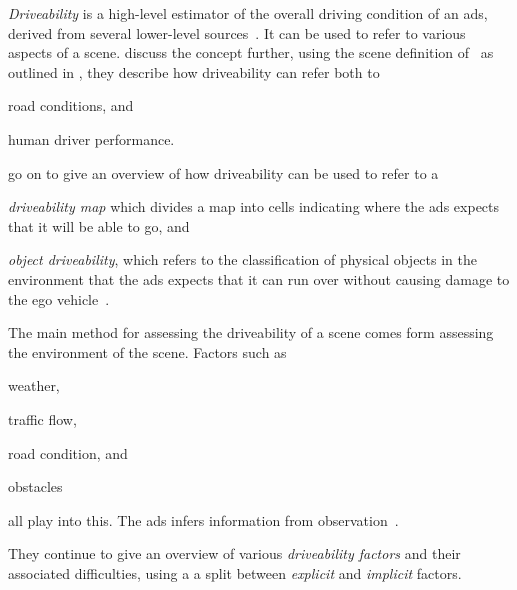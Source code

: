\emph{Driveability} is a high-level estimator of the overall driving
condition of an \acrshort{ads}, derived from several lower-level sources~\cite[3140]{safeToDrive}.
It can be used to refer to various aspects of a scene.
\citeauthor{safeToDrive} discuss the concept further, using the  scene definition
of~\citeauthor{scenes} as outlined in  , they describe
how driveability can refer both to \begin{inparaenum}
    \item road conditions, and
    \item human driver performance.
\end{inparaenum}
\citeauthor{safeToDrive} go on to give an overview of how driveability
can be used to refer to a \begin{inparaenum}\setcounter{enumi}{2}
    \item \textit{driveability map} which divides a map into
    cells indicating where the \acrshort{ads} expects that it will be able to go, and
    \item \textit{object driveability}, which refers to the classification of physical objects in
    the environment that the \acrshort{ads} expects that it can run over without causing damage to
    the ego vehicle~\cite[3135-3136]{safeToDrive}.
\end{inparaenum}

The main method for assessing the driveability of a scene comes form assessing the environment of
the scene. Factors such as \begin{inparaenum}
    \item weather,
    \item traffic flow,
    \item road condition, and
    \item obstacles \end{inparaenum} all play into this. The \acrshort{ads} infers information from
observation~\cite[3136]{safeToDrive}.

They continue to give an overview of various \textit{driveability factors} and their associated
difficulties, using a a split between \textit{explicit} and \textit{implicit} factors.

